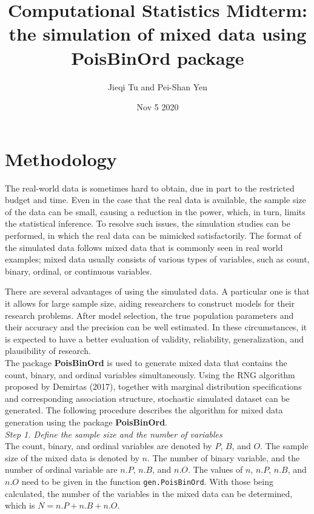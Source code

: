 \documentclass[letterpaper]{article}
\title{Computational Statistics Midterm: the simulation of mixed data using PoisBinOrd package}
\author{Jieqi Tu and Pei-Shan Yen}
\date{Nov 5 2020}
\begin{document}
\maketitle




\section{Methodology}

The real-world data is sometimes hard to obtain, due in part to the restricted budget and time. Even in the case that the real data is available, the sample size of the data can be small, causing a reduction in the power, which, in turn, limits the statistical inference. To resolve such issues, the simulation studies can be performed, in which the real data can be mimicked satisfactorily. The format of the simulated data follows 
mixed data that is commonly seen in real world examples; mixed data usually consists of various  types of variables, such as count, binary, ordinal, or continuous variables.

There are several advantages of using the simulated data. A particular one is that it allows for large sample size, aiding researchers to construct models for their research problems. After model selection, the true population parameters and their accuracy and the precision can be well estimated. In these circumstances, it is expected to have a better evaluation of validity, reliability, generalization, and plausibility of research.\\

The package \textbf{PoisBinOrd} is used to generate mixed data that contains the count, binary, and ordinal variables simultaneously. Using the RNG algorithm proposed by Demirtas (2017), together with marginal distribution specifications and corresponding association structure, stochastic simulated dataset can be generated. The following procedure describes the algorithm for mixed data generation using the package \textbf{PoisBinOrd}.\\ 

\textit{Step 1. Define the sample size and the number of variables}\\
The count, binary, and ordinal variables are denoted by $P$, $B$, and $O$. The sample size of the mixed data is denoted by $n$. The number of binary variable, and the number of ordinal variable are $n.P$, $n.B$, and 
$n.O$. The values of $n$, $n.P$, $n.B$, and 
$n.O$ need to be given in the function \texttt{gen.PoisBinOrd}. With those being calculated, the number of the variables in the mixed data can be determined, which is $N = n.P + n.B + n.O$. \\
\end{document}

